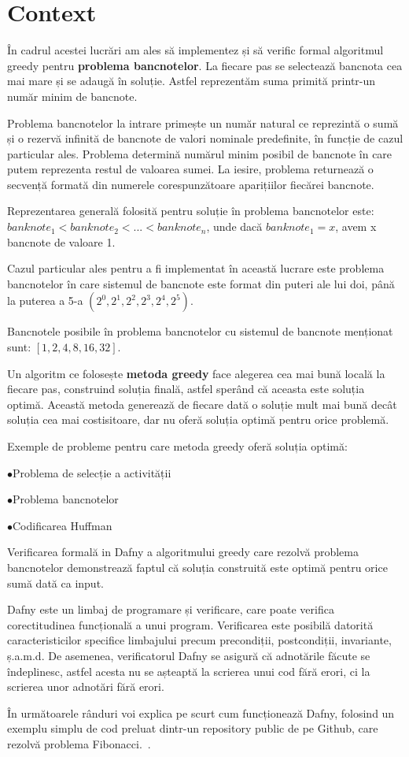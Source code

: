 
\chapter{Context} 

 
În cadrul acestei lucrări am ales să implementez și să verific formal algoritmul greedy pentru \textbf{problema bancnotelor}. La fiecare pas se selectează 
bancnota cea mai mare și se adaugă în soluție. Astfel reprezentăm suma primită printr-un număr minim de bancnote.\par

Problema bancnotelor la intrare primește un număr natural ce reprezintă o sumă și o rezervă infinită de bancnote de valori nominale predefinite, 
în funcție de cazul particular ales. Problema determină numărul minim posibil de bancnote în care putem reprezenta
restul de valoarea sumei. La iesire, problema returnează o secvență formată din numerele corespunzătoare aparițiilor 
fiecărei bancnote.\par
Reprezentarea generală folosită pentru soluție în problema bancnotelor este:
$ banknote_{1} < banknote_{2} < ... < banknote_{n}$, unde dacă $ banknote_{1} = x$, avem x bancnote de valoare 1.\par
Cazul particular ales pentru a fi implementat în această lucrare este problema bancnotelor în care sistemul de bancnote este format din puteri ale lui doi, 
până la puterea a 5-a $(2^0, 2^1, 2^2, 2^3, 2^4, 2^5)$.\par
Bancnotele posibile în problema bancnotelor cu sistemul de bancnote menționat sunt: $[1, 2, 4, 8, 16, 32]$. 

Un algoritm ce folosește \textbf{metoda greedy} face alegerea cea mai bună locală la fiecare pas, 
construind soluția finală, astfel sperând că aceasta este soluția optimă. Această metoda generează de fiecare dată 
o soluție mult mai bună decât soluția cea mai costisitoare, dar nu oferă soluția optimă pentru orice problemă.\par
Exemple de probleme pentru care metoda greedy oferă soluția optimă: \par
$\bullet$Problema de selecție a activității\par
$\bullet$Problema bancnotelor\par
$\bullet$Codificarea Huffman\par

Verificarea formală in Dafny a algoritmului greedy care rezolvă problema bancnotelor demonstrează faptul că soluția construită este optimă
pentru orice sumă dată ca input. \par
Dafny este un limbaj de programare și verificare, care poate verifica corectitudinea
funcțională a unui program. Verificarea este posibilă datorită caracteristicilor specifice limbajului precum precondiții, postcondiții, 
invariante, ș.a.m.d. De asemenea, verificatorul Dafny se asigură că adnotările făcute se îndeplinesc,
astfel acesta nu se așteaptă la scrierea unui cod fără erori, ci la scrierea unor adnotări fără erori.~\cite{leino2010dafny}\par
În următoarele rânduri voi explica pe scurt cum funcționează Dafny, folosind un exemplu simplu de cod preluat dintr-un repository public de pe Github, care 
rezolvă problema Fibonacci.~\cite{dafny:1}.

